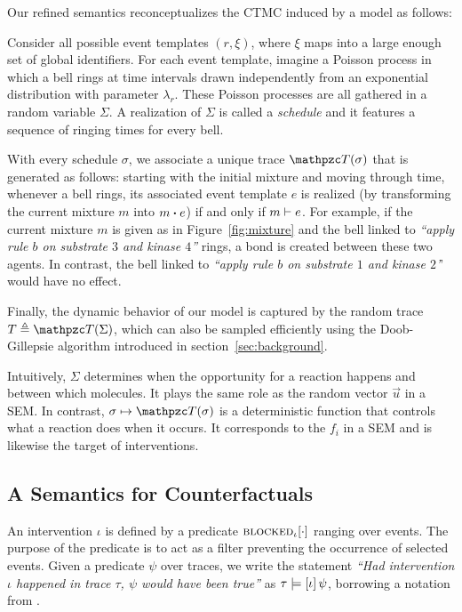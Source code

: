 Our refined semantics reconceptualizes the CTMC induced by a model as
follows:
\begin{inparaenum}[(i)]
\item Consider all possible event templates $(r, \xi)$, where $\xi$
  maps into a large enough set of global identifiers. For each event
  template, imagine a Poisson process in which a bell rings at time
  intervals drawn independently from an exponential distribution with
  parameter $\lambda_r$. These Poisson processes are all gathered in a
  random variable $\Sigma$. A realization of $\Sigma$ is called
  a \emph{schedule} and it features a sequence of ringing times
  for every bell.
\item With every schedule $\sigma$, we associate a unique trace
  $\DetTrace(\sigma)$ that is generated as follows: starting with the
  initial mixture and moving through time, whenever a bell rings, its
  associated event template $e$ is realized (by transforming the
  current mixture $m$ into $\UPDATE{m}{e}$) if and only if
  $m \vdash e$. For example, if the current mixture $m$ is
  given as in Figure~\ref{fig:mixture} and the bell linked to
  \textit{``apply rule $b$ on substrate $3$ and kinase $4$''} rings, a
  bond is created between these two agents. In contrast, the bell
  linked to \textit{``apply rule $b$ on substrate $1$ and kinase
    $2$'}' would have no effect.
\item Finally, the dynamic behavior of our model is captured by the random
  trace $T \eqdef \DetTrace(\Sigma)$, which can also be sampled
  efficiently using the Doob-Gillepsie algorithm introduced in
  section~\ref{sec:background}.
\end{inparaenum}

Intuitively, $\Sigma$ determines when the opportunity for a reaction
happens and between which molecules. It plays the same role as the
random vector $\vec u$ in a SEM. In contrast,
$\sigma \mapsto \DetTrace(\sigma)$ is a deterministic function that
controls what a reaction does when it occurs.  It corresponds to the
$f_i$ in a SEM and is likewise the target of interventions.


\subsection{A Semantics for Counterfactuals}
\label{subsec:counterfactuals-semantics}

An intervention $\iota$ is defined by a predicate
${\textsc{blocked}}_{\iota}[\cdot]$ ranging over events. The purpose of the
predicate is to act as a filter preventing the occurrence of selected
events. Given a predicate $\psi$ over traces, we write the statement
\textit{``Had intervention $\iota$ happened in trace $\tau$, $\psi$
  would have been true''} as $\tau \models [\iota] \, \psi{}$, borrowing a notation from
\cite{halpern2016actual}.

